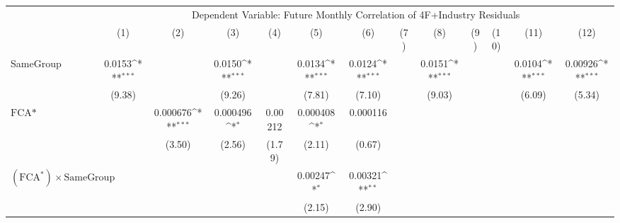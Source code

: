 {
\def\sym#1{\ifmmode^{#1}\else\(^{#1}\)\fi}
\begin{tabular}{l*{12}{c}}
\hline\hline
                &\multicolumn{12}{c}{Dependent Variable: Future Monthly Correlation of 4F+Industry Residuals}                                                                                                                                       \\\cmidrule(lr){2-13}
                &\multicolumn{1}{c}{(1)}         &\multicolumn{1}{c}{(2)}         &\multicolumn{1}{c}{(3)}         &\multicolumn{1}{c}{(4)}         &\multicolumn{1}{c}{(5)}         &\multicolumn{1}{c}{(6)}         &\multicolumn{1}{c}{(7)}         &\multicolumn{1}{c}{(8)}         &\multicolumn{1}{c}{(9)}         &\multicolumn{1}{c}{(10)}         &\multicolumn{1}{c}{(11)}         &\multicolumn{1}{c}{(12)}         \\
\hline
SameGroup       &   0.0153\sym{***}&                  &   0.0150\sym{***}&                  &   0.0134\sym{***}&   0.0124\sym{***}&                  &   0.0151\sym{***}&                  &                  &   0.0104\sym{***}&  0.00926\sym{***}\\
                &   (9.38)         &                  &   (9.26)         &                  &   (7.81)         &   (7.10)         &                  &   (9.03)         &                  &                  &   (6.09)         &   (5.34)         \\
[1em]
$ \text{FCA*} $ &                  & 0.000676\sym{***}& 0.000496\sym{*}  &  0.00212         & 0.000408\sym{*}  & 0.000116         &                  &                  &                  &                  &                  &                  \\
                &                  &   (3.50)         &   (2.56)         &   (1.79)         &   (2.11)         &   (0.67)         &                  &                  &                  &                  &                  &                  \\
[1em]
 $ (\text{FCA}^*) \times {\text{SameGroup} }  $ &                  &                  &                  &                  &  0.00247\sym{*}  &  0.00321\sym{**} &                  &                  &                  &                  &                  &                  \\
                &                  &                  &                  &                  &   (2.15)         &   (2.90)         &                  &                  &                  &                  &                  &                  \\

\end{tabular}}
